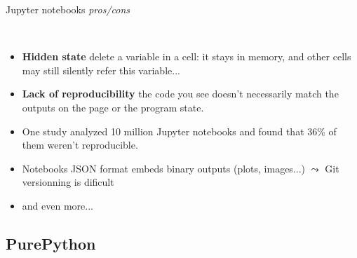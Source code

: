 \documentclass[11pt, serif, mathserif, compress]{beamer}  %
\begin{document}
\begin{frame}{Jupyter notebooks {\em pros/cons}}

  \begin {bclogo}[noborder=true, couleur=gray!20, couleurBarre=Chocolate, logo=\raisebox{1mm}{\,\huge😕}, margeG=-0.5, margeD=-0.5]
    {\ }\smallskip
    
    \begin{itemize}\setlength\itemsep{3mm}

    \item<2-> {\bf Hidden state} delete a variable in a cell: it stays in memory, and other cells may still silently refer this variable...
      
    \item<3-> {\bf Lack of reproducibility} the code you see doesn't necessarily match the outputs on the page or the program state.
      
    \item<4-> One study \cite{Guzharina1} analyzed 10 million Jupyter notebooks and found that 36\% of them weren't reproducible.
                  
    \item<5-> Notebooks JSON format embeds binary outputs (plots, images...) $\leadsto$ Git versionning is dificult

    \item<6-> and even more... 

    \end{itemize}
  \end{bclogo}
  
\end{frame}


\subsection{PurePython}
\end{document}
